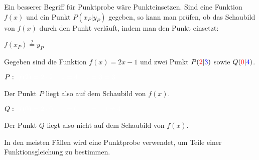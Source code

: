 Ein besserer Begriff für Punktprobe wäre Punkteinsetzen. Sind eine Funktion \(f(x)\) und ein Punkt \(P(x_P\vert y_P)\) gegeben, so kann man prüfen, ob das Schaubild von \(f(x)\) durch den Punkt verläuft, indem man den Punkt einsetzt:
\begin{tcolorbox}
	\centering
	\textcolor{loestc}{\(f(x_P)\overset{?}{=}y_P\)}
\end{tcolorbox}
\begin{bsp}
	Gegeben sind die Funktion \(f(x)=2x-1\) und zwei Punkt \(P(\textcolor{red}{2}\vert\textcolor{blue}{3})\) sowie \(Q(\textcolor{red}{0}\vert\textcolor{blue}{4})\).
	
	\(P:\ \textcolor{loes}{f(2)=2\cdot 2-1=4-1=3=3}\)
	
	Der Punkt \(P\) liegt also auf dem Schaubild von \(f(x)\).
	
	\(Q:\ \textcolor{loes}{f(0)=2\cdot 0-1=0-1=-1\neq4}\)
	
	Der Punkt \(Q\) liegt also nicht auf dem Schaubild von \(f(x)\).
\end{bsp}
In den meisten Fällen wird eine Punktprobe verwendet, um Teile einer Funktionsgleichung zu bestimmen.

